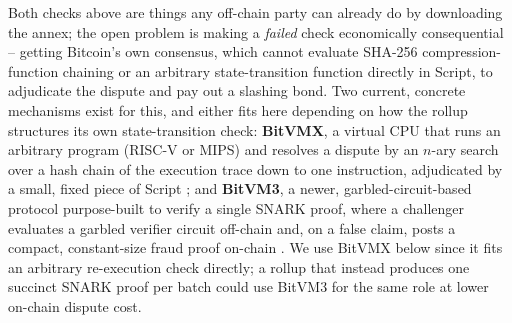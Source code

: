 Both checks above are things any off-chain party can already do by
downloading the annex; the open problem is making a \emph{failed} check
economically consequential -- getting Bitcoin's own consensus, which
cannot evaluate SHA-256 compression-function chaining or an arbitrary
state-transition function directly in Script, to adjudicate the dispute
and pay out a slashing bond. Two current, concrete mechanisms exist for
this, and either fits here depending on how the rollup structures its own
state-transition check: \textbf{BitVMX}, a virtual CPU that runs an
arbitrary program (RISC-V or MIPS) and resolves a dispute by an $n$-ary
search over a hash chain of the execution trace down to one instruction,
adjudicated by a small, fixed piece of Script \citep{lerner2024bitvmx};
and \textbf{BitVM3}, a newer, garbled-circuit-based protocol purpose-built
to verify a single SNARK proof, where a challenger evaluates a garbled
verifier circuit off-chain and, on a false claim, posts a compact,
constant-size fraud proof on-chain \citep{linuswoll2026bitvm3}. We use
BitVMX below since it fits an arbitrary re-execution check directly; a
rollup that instead produces one succinct SNARK proof per batch could use
BitVM3 for the same role at lower on-chain dispute cost.

